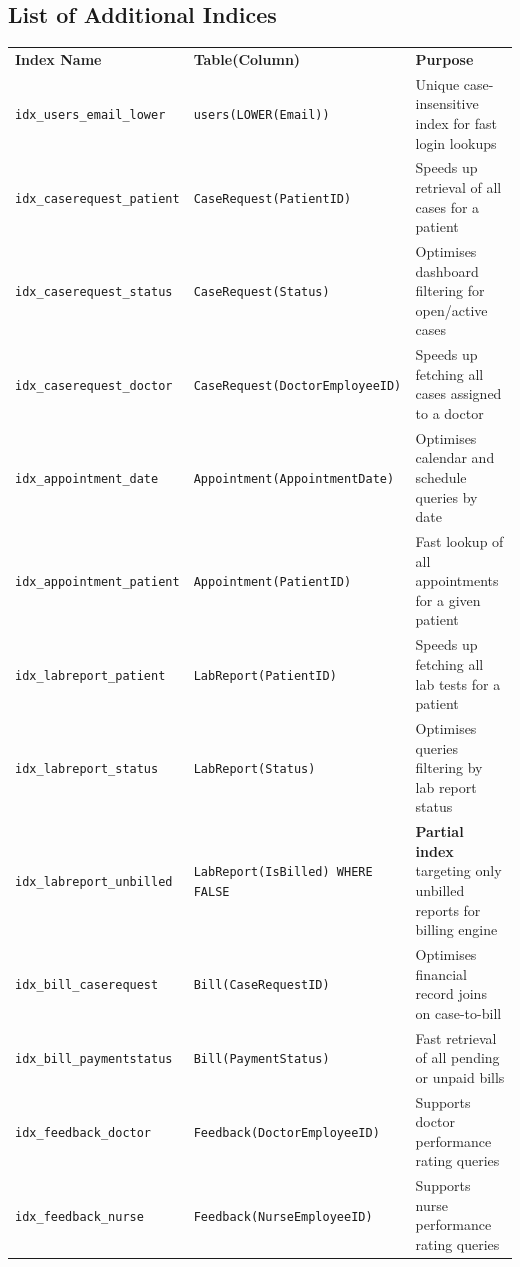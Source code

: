 \documentclass{article}
\newcommand{\theadcell}{\color{white}\bfseries}
\begin{document}
\subsection{List of Additional Indices}

\begin{center}
\renewcommand{\arraystretch}{1.5}
\begin{tabular}{L{5cm} L{4cm} L{4.5cm}}
   \theadcell Index Name & \theadcell Table(Column) & \theadcell Purpose \\
   \texttt{idx\_users\_email\_lower}  & \texttt{users(LOWER(Email))} & Unique case-insensitive index for fast login lookups \\
   \texttt{idx\_caserequest\_patient} & \texttt{CaseRequest(PatientID)} & Speeds up retrieval of all cases for a patient \\
   \texttt{idx\_caserequest\_status}  & \texttt{CaseRequest(Status)} & Optimises dashboard filtering for open/active cases \\
   \texttt{idx\_caserequest\_doctor}  & \texttt{CaseRequest(DoctorEmployeeID)} & Speeds up fetching all cases assigned to a doctor \\
   \texttt{idx\_appointment\_date}    & \texttt{Appointment(AppointmentDate)} & Optimises calendar and schedule queries by date \\
   \texttt{idx\_appointment\_patient} & \texttt{Appointment(PatientID)} & Fast lookup of all appointments for a given patient \\
   \texttt{idx\_labreport\_patient}   & \texttt{LabReport(PatientID)} & Speeds up fetching all lab tests for a patient \\
   \texttt{idx\_labreport\_status}    & \texttt{LabReport(Status)} & Optimises queries filtering by lab report status \\
   \texttt{idx\_labreport\_unbilled}  & \texttt{LabReport(IsBilled) WHERE FALSE} & \textbf{Partial index} targeting only unbilled reports for billing engine \\
   \texttt{idx\_bill\_caserequest}    & \texttt{Bill(CaseRequestID)} & Optimises financial record joins on case-to-bill \\
   \texttt{idx\_bill\_paymentstatus}  & \texttt{Bill(PaymentStatus)} & Fast retrieval of all pending or unpaid bills \\
   \texttt{idx\_feedback\_doctor}     & \texttt{Feedback(DoctorEmployeeID)} & Supports doctor performance rating queries \\
   \texttt{idx\_feedback\_nurse}      & \texttt{Feedback(NurseEmployeeID)} & Supports nurse performance rating queries \\
\end{tabular}
\end{center}
\end{document}
